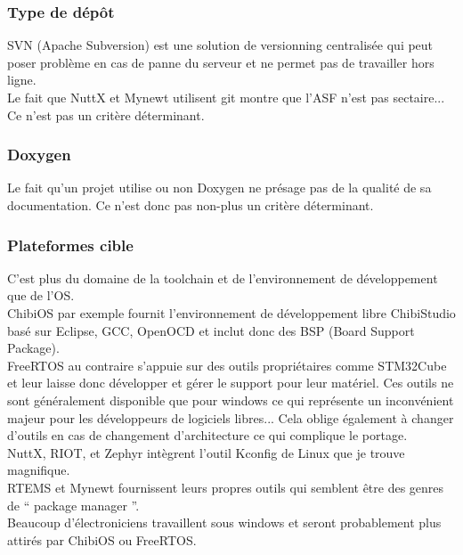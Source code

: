 \subsubsection{Type de dépôt}
SVN (Apache Subversion) est une solution de versionning centralisée qui peut poser
problème en cas de panne du serveur et ne permet pas de travailler hors ligne.\\

Le fait que NuttX et Mynewt utilisent git montre que l'ASF n'est pas sectaire...\\

Ce n'est pas un critère déterminant.

\subsubsection{Doxygen}
Le fait qu'un projet utilise ou non Doxygen ne présage pas de la qualité de sa
documentation. Ce n'est donc pas non-plus un critère déterminant.\\

\subsubsection{Plateformes cible}
C'est plus du domaine de la toolchain et de l'environnement de développement que de
l'OS.\\

ChibiOS par exemple fournit l'environnement de développement libre ChibiStudio basé
sur Eclipse, GCC, OpenOCD et inclut donc des BSP (Board Support Package).\\

FreeRTOS au contraire s'appuie sur des outils propriétaires comme STM32Cube et leur
laisse donc développer et gérer le support pour leur matériel. Ces outils ne sont
généralement disponible que pour windows ce qui représente un inconvénient majeur
pour les développeurs de logiciels libres... Cela oblige également à changer d'outils
en cas de changement d'architecture ce qui complique le portage.\\

NuttX, RIOT, et Zephyr intègrent l'outil Kconfig de Linux que je trouve magnifique.\\

RTEMS et Mynewt fournissent leurs propres outils qui semblent être des genres de
\enquote{ package manager }.\\

Beaucoup d'électroniciens travaillent sous windows et seront probablement plus
attirés par ChibiOS ou FreeRTOS.\\

